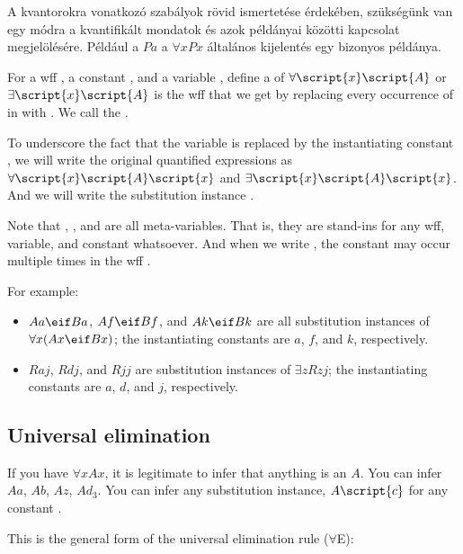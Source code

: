 A kvantorokra vonatkozó szabályok rövid ismertetése érdekében, szükségünk van egy módra a kvantifikált mondatok és azok példányai közötti kapcsolat megjelölésére. Például a $Pa$ a $\forall x Px$ általános kijelentés egy bizonyos példánya.



For a wff , a constant , and a variable , define a  of $\forall \script{x}\script{A}$ or $\exists \script{x}\script{A}$ is the wff that we get by replacing every occurrence of  in  with . We call  the .

To underscore the fact that the variable  is replaced by the instantiating constant , we will write the original quantified expressions as $\forall \script{x}\script{A}\script{x}$ and $\exists \script{x}\script{A}\script{x}$. And we will write the substitution instance .

Note that , , and  are all meta-variables. That is, they are stand-ins for any wff, variable, and constant whatsoever. And when we write , the constant  may occur multiple times in the wff .


For example:

\begin{itemize}
\item $Aa \eif Ba$, $Af \eif Bf$, and $Ak \eif Bk$ are all substitution instances of $\forall x(Ax \eif Bx)$; the instantiating constants are $a$, $f$, and $k$, respectively.
\item $Raj$, $Rdj$, and $Rjj$ are substitution instances of $\exists zRzj$; the instantiating constants are $a$, $d$, and $j$, respectively.
\end{itemize}

\subsection{Universal elimination}

If you have $\forall x Ax$, it is legitimate to infer that anything is an $A$. You can infer $Aa$, $Ab$, $Az$, $Ad_3$. You can infer any substitution instance, $A\script{c}$ for any constant .

This is the general form of the universal elimination rule ($\forall$E):

